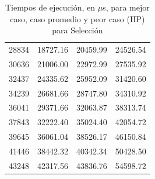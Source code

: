 \documentclass{homework}
\begin{document}
\begin{table}[H]
\begin{tabular}{|r|r|r|r|}
                28834 & 18727.16 & 20459.99 & 24526.54 \\ 
                30636 & 21006.00 & 22972.99 & 27535.92 \\ 
                32437 & 24335.62 & 25952.09 & 31420.60 \\ 
                34239 & 26681.66 & 28747.80 & 34310.92 \\ 
                36041 & 29371.66 & 32063.87 & 38313.74 \\ 
                37843 & 32222.40 & 35024.40 & 42054.72 \\ 
                39645 & 36061.04 & 38526.17 & 46150.84 \\ 
                41446 & 38442.32 & 40342.34 & 50428.50 \\ 
                43248 & 42317.56 & 43836.76 & 54598.72 \\ 
                \hline
        \end{tabular}
        \caption{Tiempos de ejecución, en $\mu$s, para mejor caso, caso promedio y peor caso (HP) para Selección}
    \end{table}
    
\end{document}
